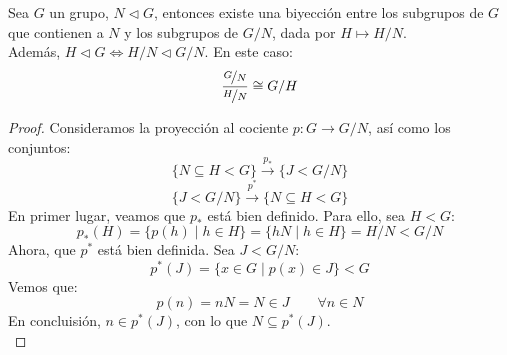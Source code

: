 \begin{teo}
    Sea $G$ un grupo, $N\lhd G$, entonces existe una biyección entre los subgrupos de $G$ que contienen a $N$ y los subgrupos de $G/N$, dada por $H\longmapsto H/N$.\\

    \noindent
    Además, $H\lhd G \Longleftrightarrow H/N\lhd G/N$.
    En este caso:
    \begin{equation*}
        \dfrac{\nicefrac{G}{N}}{\nicefrac{H}{N}} \cong G/H
    \end{equation*}
    \begin{proof}
        Consideramos la proyección al cociente $p:G\to G/N$, así como los conjuntos:
        \begin{equation*}
            \{N\subseteq H < G\} \stackrel{p_\ast}{\longrightarrow} \{J < G/N\}
        \end{equation*}
        \begin{equation*}
            \{J < G/N\} \stackrel{p^\ast}{\longrightarrow} \{N\subseteq H < G\}
        \end{equation*}
        En primer lugar, veamos que $p_\ast$ está bien definido. Para ello, sea $H<G$:
        \begin{equation*}
            p_\ast(H) = \{p(h) \mid h \in H\} = \{hN \mid h \in H\} = H/N < G/N
        \end{equation*}
        Ahora, que $p^\ast$ está bien definida. Sea $J< G/N$:
        \begin{equation*}
            p^\ast(J) = \{x\in G\mid p(x) \in J\} < G
        \end{equation*}
        Vemos que:
        \begin{equation*}
            p(n) = nN = N \in J \qquad \forall n\in N
        \end{equation*}
        En concluisión, $n\in p^\ast(J)$, con lo que $N\subseteq p^\ast(J)$.\\


\end{proof}
\end{teo}
